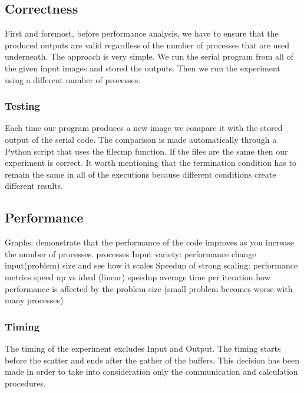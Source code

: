 \documentclass[12pt,a4paper]{article}
\begin{document}
    \subsection{Correctness}
        First and foremost, before performance analysis, we have to ensure that the produced outputs are valid regardless of the number of processes that are used underneath. The approach is very simple. We run the serial program from all of the given input images and stored the outputs. Then we run the experiment using a different number of processes.

        \subsubsection{Testing}
            Each time our program produces a new image we compare it with the stored output of the serial code. The comparison is made automatically through a Python script that uses the filecmp function. If the files are the same then our experiment is correct. It worth mentioning that the termination condition has to remain the same in all of the executions because different conditions create different results.


    \subsection{Performance}
        Graphs: demonstrate that the performance of the code improves as you increase the number of processes.
            processes
            Input variety: performance change input(problem) size and see how it scales
            Speedup of strong scaling: performance metrics speed up vs ideal (linear) speedup
            average time per iteration
            how performance is affected by the problem size (small problem becomes worse with many processes)

        \subsubsection{Timing}
            The timing of the experiment excludes Input and Output. The timing starts before the scatter and ends after the gather of the buffers. This decision has been made in order to take into consideration only the communication and calculation procedures.
            
\end{document}

